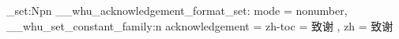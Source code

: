 \cs_set:Npn \__whu_acknowledgement_format_set:
  {
      {
        mode    = nonumber,
      }
    \__whu_set_constant_family:n
      {
        acknowledgement =
          {
            zh-toc = 致谢 ,
            zh     = 致\qquad 谢
          }
      }
  }










